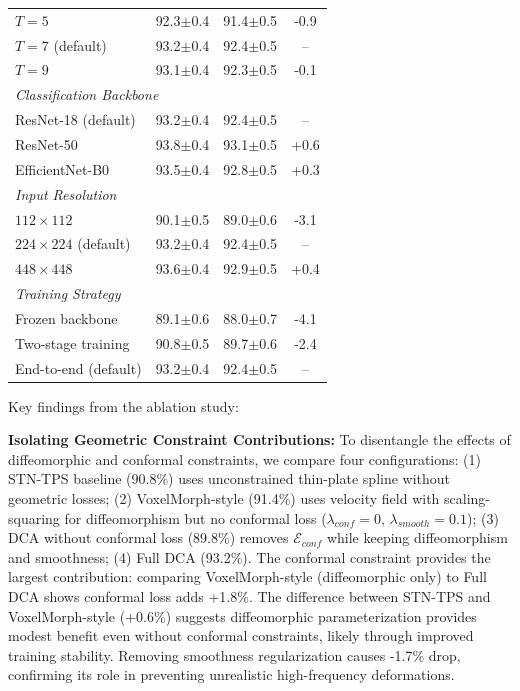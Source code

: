 \documentclass[10pt,journal,compsoc]{IEEEtran}
\begin{document}
\begin{table}[t]
\begin{tabular}{lccc}
\quad $T=5$ & 92.3$\pm$0.4 & 91.4$\pm$0.5 & -0.9 \\
\quad $T=7$ (default) & 93.2$\pm$0.4 & 92.4$\pm$0.5 & -- \\
\quad $T=9$ & 93.1$\pm$0.4 & 92.3$\pm$0.5 & -0.1 \\
\hline
\multicolumn{4}{l}{\textit{Classification Backbone}} \\
\quad ResNet-18 (default) & 93.2$\pm$0.4 & 92.4$\pm$0.5 & -- \\
\quad ResNet-50 & 93.8$\pm$0.4 & 93.1$\pm$0.5 & +0.6 \\
\quad EfficientNet-B0 & 93.5$\pm$0.4 & 92.8$\pm$0.5 & +0.3 \\
\hline
\multicolumn{4}{l}{\textit{Input Resolution}} \\
\quad $112 \times 112$ & 90.1$\pm$0.5 & 89.0$\pm$0.6 & -3.1 \\
\quad $224 \times 224$ (default) & 93.2$\pm$0.4 & 92.4$\pm$0.5 & -- \\
\quad $448 \times 448$ & 93.6$\pm$0.4 & 92.9$\pm$0.5 & +0.4 \\
\hline
\multicolumn{4}{l}{\textit{Training Strategy}} \\
\quad Frozen backbone & 89.1$\pm$0.6 & 88.0$\pm$0.7 & -4.1 \\
\quad Two-stage training & 90.8$\pm$0.5 & 89.7$\pm$0.6 & -2.4 \\
\quad End-to-end (default) & 93.2$\pm$0.4 & 92.4$\pm$0.5 & -- \\
\hline
\end{tabular}
\end{table}

Key findings from the ablation study:

\textbf{Isolating Geometric Constraint Contributions:} To disentangle the effects of diffeomorphic and conformal constraints, we compare four configurations: (1) STN-TPS baseline (90.8\%) uses unconstrained thin-plate spline without geometric losses; (2) VoxelMorph-style (91.4\%) uses velocity field with scaling-squaring for diffeomorphism but no conformal loss ($\lambda_{conf}=0$, $\lambda_{smooth}=0.1$); (3) DCA without conformal loss (89.8\%) removes $\mathcal{E}_{conf}$ while keeping diffeomorphism and smoothness; (4) Full DCA (93.2\%). The conformal constraint provides the largest contribution: comparing VoxelMorph-style (diffeomorphic only) to Full DCA shows conformal loss adds +1.8\%. The difference between STN-TPS and VoxelMorph-style (+0.6\%) suggests diffeomorphic parameterization provides modest benefit even without conformal constraints, likely through improved training stability. Removing smoothness regularization causes -1.7\% drop, confirming its role in preventing unrealistic high-frequency deformations.
\end{document}
